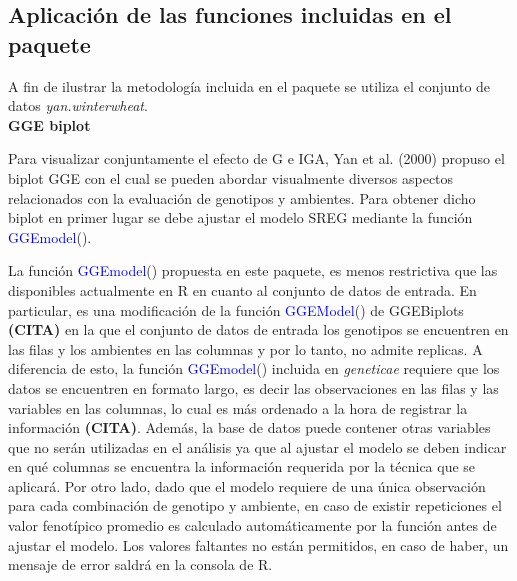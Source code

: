 \subsection{Aplicación de las funciones incluidas en el paquete}

A fin de ilustrar la metodología incluida en el paquete se utiliza el conjunto de datos \emph{yan.winterwheat}.\\

\textbf{GGE biplot}

Para visualizar conjuntamente el efecto de G e IGA, Yan et al. (2000) propuso el biplot GGE con el cual se pueden abordar visualmente diversos aspectos relacionados con la evaluación de genotipos y ambientes. Para obtener dicho biplot en primer lugar se debe ajustar el modelo SREG mediante la función \textcolor{blue}{GGEmodel}(). 

La función \textcolor{blue}{GGEmodel}() propuesta en este paquete, es menos restrictiva que las disponibles actualmente en R en cuanto al conjunto de datos de entrada. En particular, es una modificación de la función \textcolor{blue}{GGEModel}() de GGEBiplots \textbf{(CITA)} en la que el conjunto de datos de entrada los genotipos se encuentren en las filas y los ambientes en las columnas y por lo tanto, no admite replicas. A diferencia de esto, la función \textcolor{blue}{GGEmodel}() incluida en \emph{geneticae} requiere que los datos se encuentren en formato largo, es decir las observaciones en las filas y las variables en las columnas, lo cual es más ordenado a la hora de registrar la información \textbf{(CITA)}. Además, la base de datos puede contener otras variables que no serán utilizadas en el análisis ya que al ajustar el modelo se deben indicar en qué columnas se encuentra la información requerida por la técnica que se aplicará. Por otro lado, dado que el modelo requiere de una única observación para cada combinación de genotipo y ambiente, en caso de existir repeticiones el valor fenotípico promedio es calculado automáticamente por la función antes de ajustar el modelo. Los valores faltantes no están permitidos, en caso de haber, un mensaje de error saldrá en la consola de R.\\  

